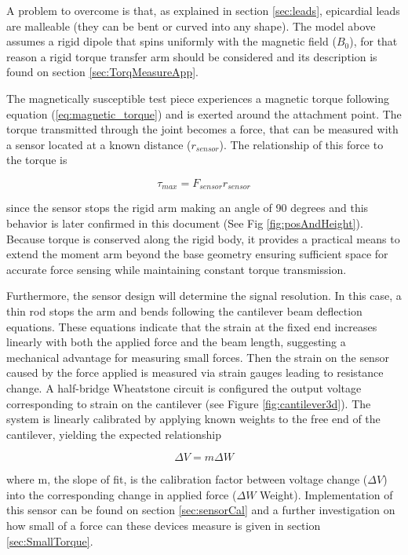 A problem to overcome is that, as explained in section \ref{sec:leads}, epicardial leads are malleable (they can be bent or curved into any shape). The model above assumes a rigid dipole that spins uniformly with the magnetic field ($B_0$), for that reason a rigid torque transfer arm should be considered and its description is found on section \ref{sec:TorqMeasureApp}.

The magnetically susceptible test piece experiences a magnetic torque following equation (\ref{eq:magnetic_torque}) and is exerted around the attachment point. The torque transmitted through the joint becomes a force, that can be measured with a sensor located at a known distance ($r_{sensor}$). The relationship of this force to the torque is 

\begin{equation}
	\tau_{max} = F_{sensor} r_{sensor}
\end{equation}

\noindent since the sensor stops the rigid arm making an angle of 90 degrees and this behavior is later confirmed in this document (See Fig \ref{fig:posAndHeight}). Because torque is conserved along the rigid body, it provides a practical means to extend the moment arm beyond the base geometry ensuring sufficient space for accurate force sensing while maintaining constant torque transmission. 

Furthermore, the sensor design will determine the signal resolution. In this case, a thin rod stops the arm and bends following the cantilever beam deflection equations. These equations indicate that the strain at the fixed end increases linearly with both the applied force and the beam length, suggesting a mechanical advantage for measuring small forces. Then the strain on the sensor caused by the force applied is measured via strain gauges leading to resistance change. A half-bridge Wheatstone circuit is configured the output voltage corresponding to strain on the cantilever (see Figure \ref{fig:cantilever3d}). The system is linearly calibrated by applying known weights to the free end of the cantilever, yielding the expected relationship

\begin{equation}
	\Delta V = m \Delta W
	\label{eq:torqueCal}
\end{equation}

\noindent where m, the slope of fit, is the calibration factor between voltage change ($\Delta V$) into the corresponding change in applied force ($\Delta W$ Weight). Implementation of this sensor can be found on section \ref{sec:sensorCal} and a further investigation on how small of a force can these devices measure is given in section \ref{sec:SmallTorque}.

